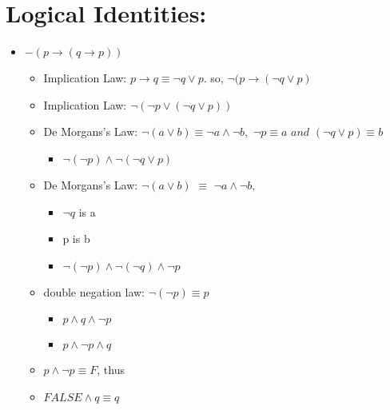 \documentclass[11pt]{article}
\begin{document}
\section*{Logical Identities: }

\begin{itemize}
\item $-(p \to (q \to p))$

 \begin{itemize}
\item Implication Law: $p \to q \equiv \neg q \vee p $. so, $ \neg (p \to (\neg q \vee p) $
\item Implication Law: $ \neg ( \neg p \vee (\neg q \vee p))$
\item De Morgans's Law: $\neg (a \vee b) \equiv \neg a \wedge \neg b,$  $\neg p \equiv  a $ $ and $ $(\neg q \vee p) \equiv b $ 
\begin{itemize}
\item $ \neg( \neg p) \wedge \neg ( \neg q \vee p)$
\end{itemize}
\item De Morgans's Law: $\neg (a \vee b)$ $ \equiv $ $\neg a \wedge \neg b,$
\begin{itemize}
\item $\neg q $ is a 
\item p is b 
\item $ \neg (\neg p) \wedge \neg(\neg q) \wedge \neg p$
\end{itemize}
\item double negation law: $\neg (\neg p ) \equiv p $ 
\begin{itemize}
\item $p \wedge q \wedge \neg p $
\item $p \wedge \neg p \wedge q $
\end{itemize}
\item $p \wedge \neg p \equiv F $, thus 
\item $FALSE \wedge q  \equiv q $
\end{itemize}
\end{itemize}
\end{document}
